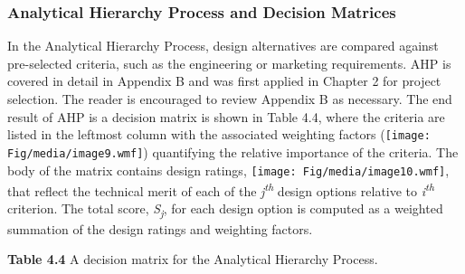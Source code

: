 \subsubsection{Analytical Hierarchy Process and Decision
Matrices}\label{analytical-hierarchy-process-and-decision-matrices}

In the Analytical Hierarchy Process, design alternatives are compared
against pre-selected criteria, such as the engineering or marketing
requirements. AHP is covered in detail in Appendix B and was first
applied in Chapter 2 for project selection. The reader is encouraged to
review Appendix B as necessary. The end result of AHP is a decision
matrix is shown in Table 4.4, where the criteria are listed in the
leftmost column with the associated weighting factors
(\texttt{[image: Fig/media/image9.wmf]}) quantifying the relative
importance of the criteria. The body of the matrix contains design
ratings, \texttt{[image: Fig/media/image10.wmf]}, that reflect the
technical merit of each of the \emph{j\textsuperscript{th}} design
options relative to \emph{i\textsuperscript{th}} criterion. The total
score, \emph{S\textsubscript{j}}, for each design option is computed as
a weighted summation of the design ratings and weighting factors.

\textbf{Table 4.4} A decision matrix for the Analytical Hierarchy
Process.

